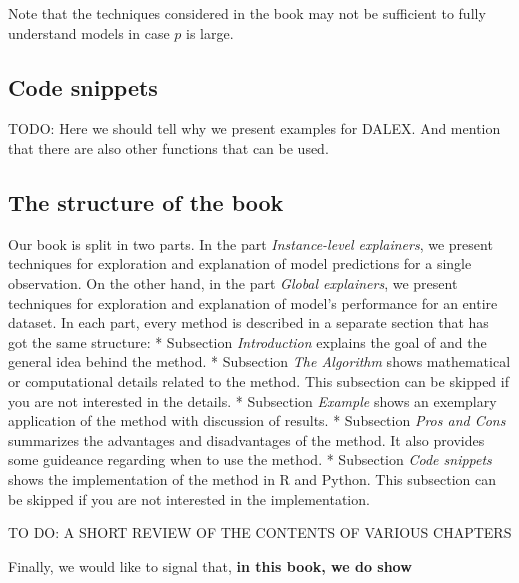 \documentclass[]{krantz}
\theoremstyle{definition}
\theoremstyle{definition}
\theoremstyle{definition}
\theoremstyle{remark}
\begin{document}
Note that the techniques considered in the book may not be sufficient to
fully understand models in case \(p\) is large.

\hypertarget{code-snippets}{%
\subsection{Code snippets}\label{code-snippets}}

TODO: Here we should tell why we present examples for DALEX. And mention
that there are also other functions that can be used.

\hypertarget{the-structure-of-the-book}{%
\subsection{The structure of the book}\label{the-structure-of-the-book}}

Our book is split in two parts. In the part \emph{Instance-level
explainers}, we present techniques for exploration and explanation of
model predictions for a single observation. On the other hand, in the
part \emph{Global explainers}, we present techniques for exploration and
explanation of model's performance for an entire dataset. In each part,
every method is described in a separate section that has got the same
structure: * Subsection \emph{Introduction} explains the goal of and the
general idea behind the method. * Subsection \emph{The Algorithm} shows
mathematical or computational details related to the method. This
subsection can be skipped if you are not interested in the details. *
Subsection \emph{Example} shows an exemplary application of the method
with discussion of results. * Subsection \emph{Pros and Cons} summarizes
the advantages and disadvantages of the method. It also provides some
guideance regarding when to use the method. * Subsection \emph{Code
snippets} shows the implementation of the method in R and Python. This
subsection can be skipped if you are not interested in the
implementation.

TO DO: A SHORT REVIEW OF THE CONTENTS OF VARIOUS CHAPTERS

Finally, we would like to signal that, \textbf{in this book, we do show}
\end{document}
